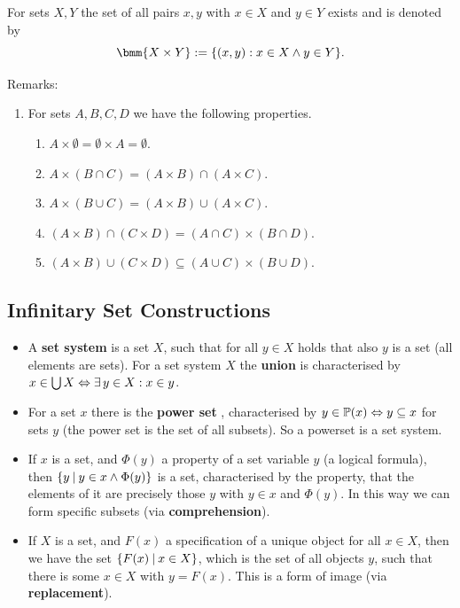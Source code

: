 \documentclass[12pt]{book}
\begin{document}
\begin{defi}\label{def:productsets}
  For sets $X, Y$ the set of all pairs $x, y$ with $x \in X$ and $y \in Y$ exists and is denoted by
  \begin{displaymath}
    \bmm{X \times Y} := \set{(x,y): x \in X \wedge y \in Y}.
  \end{displaymath}
\end{defi}
Remarks:
\begin{enumerate}
 \item For sets $A, B, C, D$ we have the following properties.
  \begin{enumerate}
  \item\label{thm:propprod5} $A \times \emptyset = \emptyset \times A = \emptyset$.
  \item\label{thm:propprod1} $A \times (B \cap C) = (A\times B) \cap (A \times C)$.
  \item\label{thm:propprod2} $A \times (B \cup C) = (A \times B) \cup (A \times C)$.
  \item\label{thm:propprod3} $(A \times B) \cap (C \times D) = (A \cap C) \times (B \cap D)$.
  \item\label{thm:propprod4} $(A \times B) \cup (C \times D) \subseteq (A \cup C) \times (B \cup D)$.
  \end{enumerate}
\end{enumerate}

\subsection{Infinitary Set Constructions}
\label{sec:Infinitary set constructions}

\begin{itemize}
\item A \textbf{set system} is a set $X$, such that for all $y \in X$ holds that also $y$ is a set (all elements are sets). For a set system $X$ the \textbf{union}  is characterised by $x \in \bigcup X \Leftrightarrow \exists\, y \in X : x \in y$.
\item For a set $x$ there is the \textbf{power set} , characterised by $y \in \operatorname{\mathbb{P}}(x) \Leftrightarrow y \subseteq x$ for sets $y$ (the power set is the set of all subsets). So a powerset is a set system.
\item If $x$ is a set, and $\Phi(y)$ a property of a set variable $y$ (a logical formula), then $\{ y {\:|\:} y \in x \wedge \Phi(y) \}$ is a set, characterised by the property, that the elements of it are precisely those $y$ with $y \in x$ and $\Phi(y)$. In this way we can form specific subsets (via \textbf{comprehension}).
\item If $X$ is a set, and $F(x)$ a specification of a unique object for all $x \in X$, then we have the set $\{ F(x) {\:|\:} x \in X \}$, which is the set of all objects $y$, such that there is some $x \in X$ with $y = F(x)$. This is a form of image (via \textbf{replacement}).
\end{itemize}
\end{document}
